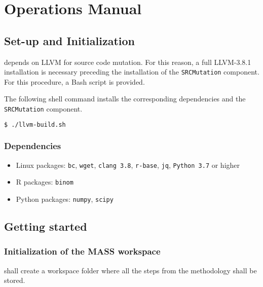 
\chapter{Operations Manual}

\section{Set-up and Initialization}
\label{sec:install}

\MASS depends on LLVM for source code mutation. For this reason, a full LLVM-3.8.1 installation is necessary preceding the installation of the \texttt{SRCMutation} component. For this procedure, a Bash script is provided.

The following shell command installs the corresponding dependencies and the \texttt{SRCMutation} component.

\begin{lstlisting}[language=bash]
  $ ./llvm-build.sh
\end{lstlisting}

\subsection{Dependencies}


\begin{itemize}
	\item Linux packages: \texttt{bc}, \texttt{wget}, \texttt{clang 3.8}, \texttt{r-base}, \texttt{jq}, \texttt{Python 3.7} or higher
	\item R packages: \texttt{binom}
	\item Python packages: \texttt{numpy}, \texttt{scipy}
\end{itemize}


\section{Getting started}

\subsection{Initialization of the MASS workspace}

\MASS shall create a workspace folder where all the steps from the methodology shall be stored. 

